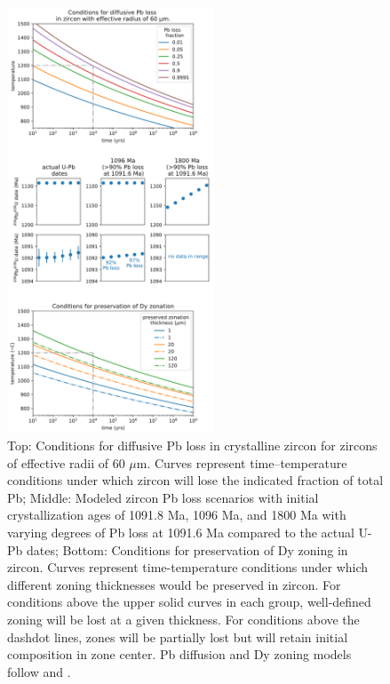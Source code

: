 \documentclass[draft]{agujournal2019}
\begin{document}
\begin{figure}[h!]
\noindent\includegraphics[width=0.55\textwidth]{diffusive_loss.pdf}
\centering
\caption{\footnotesize{Top: Conditions for diffusive Pb loss in crystalline zircon for zircons of effective radii of 60 $\mu$m. Curves represent time–temperature conditions under which zircon will lose the indicated fraction of total Pb; Middle: Modeled zircon Pb loss scenarios with initial crystallization ages of 1091.8 Ma, 1096 Ma, and 1800 Ma with varying degrees of Pb loss at 1091.6 Ma compared to the actual U-Pb dates; Bottom: Conditions for preservation of Dy zoning in zircon. Curves represent time-temperature conditions under which different zoning thicknesses would be preserved in zircon. For conditions above the upper solid curves in each group, well-defined zoning will be lost at a given thickness. For conditions above the dashdot lines, zones will be partially lost but will retain initial composition in zone center. Pb diffusion and Dy zoning models follow  and .}}
\label{fig:diffusive_loss}
\end{figure}
\end{document}
